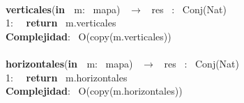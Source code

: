 \begin{Algoritmos}
\\
\makebox[\linewidth]{\rule{\textwidth}{0.4pt}}
\textbf{verticales}(\textbf{in \ }m: \ mapa) \ $\longrightarrow$ \ res \ : \ Conj(Nat)\\
1: \  \ \textbf{return} \ m.verticales\\
\textbf{Complejidad}: \ O(copy(m.verticales))\\
\makebox[\linewidth]{\rule{\textwidth}{0.4pt}}
\\
\makebox[\linewidth]{\rule{\textwidth}{0.4pt}}
\textbf{horizontales}(\textbf{in \ }m: \ mapa) \ $\longrightarrow$ \ res \ : \ Conj(Nat)\\
1: \  \ \textbf{return} \ m.horizontales\\
\textbf{Complejidad}: \ O(copy(m.horizontales))\\
\makebox[\linewidth]{\rule{\textwidth}{0.4pt}}

\end{Algoritmos}
